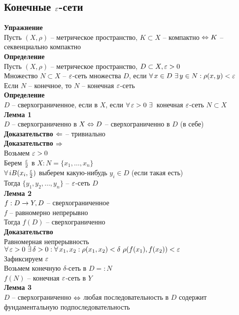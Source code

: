 \documentclass[12pt]{article}
\begin{document}
\subsection{Конечные $\varepsilon$-сети}
\textbf{Упражнение}\\
Пусть $(X, \rho)$ -- метрическое пространство, $K \subset X$ -- компактно $\Leftrightarrow K$ -- секвенциально компактно\\
\textbf{Определение}\\
Пусть $(X, \rho)$ -- метрическое пространство, $D \subset X, \varepsilon > 0$\\
Множество $N \subset X$ -- $\varepsilon$-сеть множества $D$, если $\forall\, x \in D \ \exists\, y \in N: \rho(x, y) < \varepsilon$\\
Если $N$ -- конечное, то $N$ -- конечная $\varepsilon$-сеть\\
\textbf{Определение}\\
$D$ -- сверхограниченное, если в $X$, если $\forall\, \varepsilon > 0 \ \exists\,$ конечная $\varepsilon$-сеть $N \subset X$\\
\textbf{Лемма 1}\\
$D$ -- сверхограниченно в $X \Leftrightarrow D$ -- сверхограниченно в $D$ (в себе)\\
\textbf{Доказательство $\Leftarrow$} -- тривиально\\
\textbf{Доказательство $\Rightarrow$}\\
Возьмем $\varepsilon > 0$\\
Берем $\frac{\varepsilon}2$ в $X: N = \{ x_1, \ldots, x_n\}$\\
$\forall\, i B(x_i, \frac{\varepsilon}2)$ выберем какую-нибудь $y_i \in D$ (если такая есть)\\
Тогда $\{ y_1, y_2, \ldots, y_n\}$ -- $\varepsilon$-сеть $D$\\
\textbf{Лемма 2}\\
$f: D \rightarrow Y, D$ -- сверхограниченное\\
$f$ -- равномерно непрерывно\\
Тогда $f(D)$ -- сверхограниченно\\
\textbf{Доказательство}\\
Равномерная непрерывность $\fall \eps > 0\ \ex \delta > 0: \fall x_1, x_2: \rho(x_1, x_2) < \delta\ \rho(f(x_1), f(x_2)) < \eps$\\
Зафиксируем $\varepsilon$\\
Возьмем конечную $\delta$-сеть в $D =: N$\\
$f(N)$ -- конечная $\varepsilon$-сеть в $Y$\\
\textbf{Лемма 3}\\
$D$ -- сверхограниченно $\Leftrightarrow$ любая последовательность в $D$ содержит фундаментальную подпоследовательность\\
\end{document}
